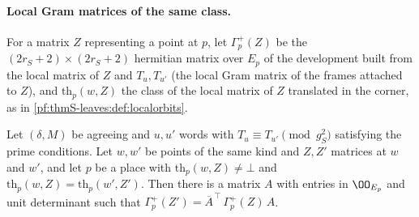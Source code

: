 \paragraph{Local Gram matrices of the same class.} For a matrix $Z$ representing a point at $p$, let $\Gamma^+_p(Z)$ be the
$(2r_S+2)\times(2r_S+2)$ hermitian matrix over $E_p$ of the development built from the local matrix of $Z$ and $T_u,T_{u'}$ (the local Gram
matrix of the frames attached to $Z$), and $\mathrm{th}_p(w,Z)$ the class of the local matrix of $Z$ translated in the corner, as in
\cref{pf:thmS-leaves:def:localorbits}.

\begin{proposition}\label{pf:thmS-leaves:prop:gaplus}
Let $(\delta,M)$ be agreeing and $u,u'$ words with $T_u\equiv T_{u'}\pmod{g_S^2}$ satisfying the prime conditions. Let $w,w'$ be points of the same
kind and $Z,Z'$ matrices at $w$ and $w'$, and let $p$ be a place with $\mathrm{th}_p(w,Z)\ne\bot$ and $\mathrm{th}_p(w,Z)=\mathrm{th}_p(w',Z')$. Then there is a
matrix $A$ with entries in $\OO_{E_p}$ and unit determinant such that $\Gamma^+_p(Z')=\overline A^{\,\top}\,\Gamma^+_p(Z)\,A$.
\end{proposition}

